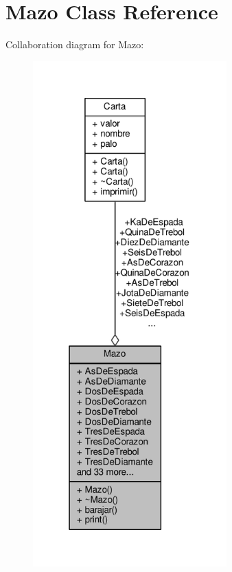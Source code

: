 \hypertarget{class_mazo}{\section{Mazo Class Reference}
\label{class_mazo}
}


Collaboration diagram for Mazo\+:
\nopagebreak
\begin{figure}[H]
\begin{center}
\leavevmode
\includegraphics[height=550pt]{class_mazo__coll__graph}
\end{center}
\end{figure}
